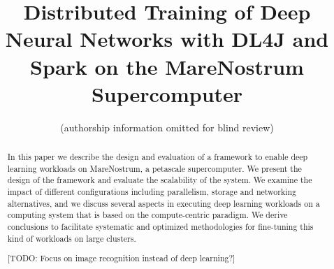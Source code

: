 \documentclass[journal]{IEEEtran}
\begin{document}
\title{Distributed Training of Deep Neural Networks with DL4J and Spark on the MareNostrum Supercomputer}

%

%                       

\author{
		(authorship information omitted for blind review)

                       
}


%


\maketitle\thispagestyle{empty}


\begin{abstract}
In this paper we describe the design and evaluation of a framework to enable deep learning workloads on MareNostrum, a petascale supercomputer. We present the design of the framework and evaluate the scalability of the system. We examine the impact of different configurations including parallelism, storage and networking alternatives, and we discuss several aspects in executing deep learning workloads on a computing system that is based on the compute-centric paradigm. We derive conclusions to facilitate systematic and optimized methodologies for fine-tuning this kind of workloads on large clusters. 

[TODO: Focus on image recognition instead of deep learning?]
\end{abstract}
\end{document}
